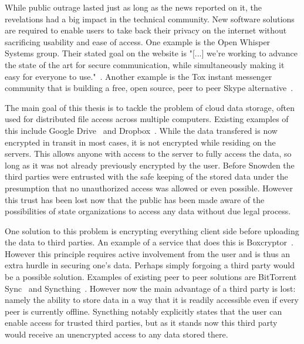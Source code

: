 While public outrage lasted just as long as the news reported on it, the revelations had a big impact in the technical community.
New software solutions are required to enable users to take back their privacy on the internet without sacrificing usability and ease of access.
One example is the Open Whisper Systems group.
Their stated goal on the website is "[...] we're working to advance the state of the art for secure communication, while simultaneously making it easy for everyone to use."~\cite{web:site:whispersystems:about}.
Another example is the Tox instant messenger community that is building a free, open source, peer to peer Skype alternative~\cite{web:site:tox}.


The main goal of this thesis is to tackle the problem of cloud data storage, often used for distributed file access across multiple computers.
Existing examples of this include Google Drive~\cite{web:site:gdrive} and Dropbox~\cite{web:site:dropbox}.
While the data transfered is now encrypted in transit in most cases, it is not encrypted while residing on the servers.
This allows anyone with access to the server to fully access the data, so long as it was not already previously encrypted by the user.
Before Snowden the third parties were entrusted with the safe keeping of the stored data under the presumption that no unauthorized access was allowed or even possible.
However this trust has been lost now that the public has been made aware of the possibilities of state organizations to access any data without due legal process.

One solution to this problem is encrypting everything client side before uploading the data to third parties.
An example of a service that does this is Boxcryptor~\cite{web:site:boxcryptor}.
However this principle requires active involvement from the user and is thus an extra hurdle in securing one's data.
Perhaps simply forgoing a third party would be a possible solution.
Examples of existing peer to peer solutions are BitTorrent Sync~\cite{web:site:bittorrent_sync} and Syncthing~\cite{web:site:synthing}.
However now the main advantage of a third party is lost: namely the ability to store data in a way that it is readily accessible even if every peer is currently offline.
Syncthing notably explicitly states that the user can enable access for trusted third parties, but as it stands now this third party would receive an unencrypted access to any data stored there.

